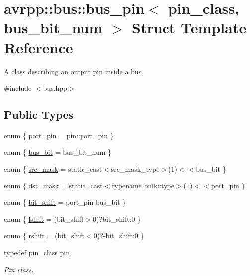 \hypertarget{structavrpp_1_1bus_1_1bus__pin}{
\section{avrpp::bus::bus\_\-pin$<$ pin\_\-class, bus\_\-bit\_\-num $>$ Struct Template Reference}
\label{structavrpp_1_1bus_1_1bus__pin}
}


A class describing an output pin inside a bus.  




{\ttfamily \#include $<$bus.hpp$>$}

\subsection*{Public Types}
\begin{DoxyCompactItemize}
\item 
enum \{ \hyperlink{structavrpp_1_1bus_1_1bus__pin_a0b738638d43a072d7f61857bfdd96c5ba56893600916502906dd7233f651ebc55}{port\_\-pin} =  pin::port\_\-pin
 \}
\item 
enum \{ \hyperlink{structavrpp_1_1bus_1_1bus__pin_a7573a6e820f736de9b278a8b0005cdb9aacd5a8a6d66675a0ac2fc9f2860e54af}{bus\_\-bit} =  bus\_\-bit\_\-num
 \}
\item 
enum \{ \hyperlink{structavrpp_1_1bus_1_1bus__pin_a2e4306bf231d90eb5a7a929099c611f2a84086ca50cd436bf19887f0216325155}{src\_\-mask} =  static\_\-cast$<$src\_\-mask\_\-type$>$(1)$<$$<$bus\_\-bit
 \}
\item 
enum \{ \hyperlink{structavrpp_1_1bus_1_1bus__pin_a7487f124c2cb751c596f6f5e6e613cc8adb46758cdedccfdda226339b608bcede}{dst\_\-mask} =  static\_\-cast$<$typename bulk::type$>$(1)$<$$<$port\_\-pin
 \}
\item 
enum \{ \hyperlink{structavrpp_1_1bus_1_1bus__pin_a9ed54c4fed3cd88343a441825be92e7fab86815a400017547219f3fcf4c902574}{bit\_\-shift} =  port\_\-pin-\/bus\_\-bit
 \}
\item 
enum \{ \hyperlink{structavrpp_1_1bus_1_1bus__pin_a874e1f75a91b859d349b1d251bc55d83a4981695193f4d4a2f01ce564e86ebbe7}{lshift} =  (bit\_\-shift$>$0)?bit\_\-shift:0
 \}
\item 
enum \{ \hyperlink{structavrpp_1_1bus_1_1bus__pin_a160c0079ea83d9388b22ba4354b6848ca4a1647e8ac04b525055aad4a2806fa1c}{rshift} =  (bit\_\-shift$<$0)?-\/bit\_\-shift:0
 \}
\item 
typedef pin\_\-class \hyperlink{structavrpp_1_1bus_1_1bus__pin_ab740264ee1e092b8834aeb2f9b1cc609}{pin}
\begin{DoxyCompactList}\small\item\em Pin class. \item\end{DoxyCompactList}\item 

\end{DoxyCompactItemize}

